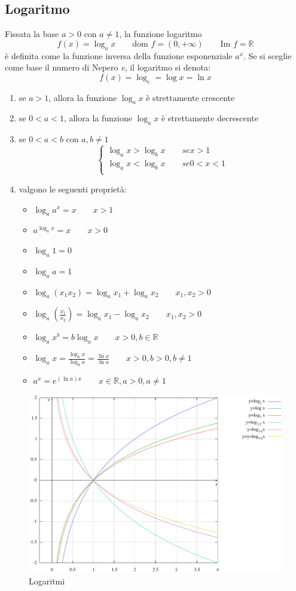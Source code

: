 \documentclass[11pt,a4paper,notitlepage]{report}
\let\numberset\mathbb
\newcommand{\R}{\numberset{R}}
\newcommand{\dom}{\text{dom }}
\newcommand{\im}{\text{Im }}
\begin{document}
\subsection{Logaritmo}
Fissata la base $a>0$ con $a\neq 1$, la funzione logaritmo
\[f(x)=\log_a x \qquad \dom f = (0,+\infty) \qquad \im f = \R\]
è definita come la funzione inversa della funzione esponenziale $a^x$. Se si sceglie come base il numero di Nepero \textit{e}, il logaritmo si denota:
\[f(x)=\log_e = \log x = \ln x\]

\begin{enumerate}
	\item se $a>1$, allora la funzione $\log_a x$ è strettamente crescente
	\item se $0<a<1$, allora la funzione $\log_a x$ è strettamente decrescente
	\item se $0<a<b$ con $a,b\neq 1$
	\[\begin{cases}
	\log_a x > \log_b x \qquad se x>1 \\
	\log_a x < \log_b x \qquad se 0<x<1 \\
	\end{cases}\]
	\item valgono le seguenti proprietà:
	\begin{itemize}
		\item $\log_a a^x = x \qquad x>1$
		\item $a^{\log_a x}=x \qquad x>0$
		\item $\log_a 1 = 0$
		\item $\log_a a = 1$
		\item $\log_a (x_1 x_2)= \log_a x_1 + \log_a x_2 \qquad x_1,x_2 > 0$
		\item $\log_a (\frac{x_1}{x_2})=\log_a x_1 - \log_a x_2 \qquad x_1,x_2 > 0$
		\item $\log_a x^b = b \log_a x \qquad x>0, b \in \R$
		\item $\log_a x= \frac{\log_b x}{\log_b a}=\frac{\ln x}{\ln a}\qquad x>0,b>0,b\neq 1$
		\item $a^x = e^{(\ln a)x} \qquad x\in \R, a>0, a \neq 1$
	\end{itemize}
\end{enumerate}
\begin{figure}[H]
  \centering
    \includegraphics[width=1\textwidth]{images/logaritmi.png}
  \caption{Logaritmi}
\end{figure}
\end{document}
